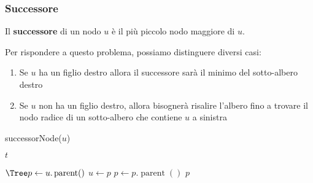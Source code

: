         \subsubsection{Successore}
            \begin{definition}
                Il \textbf{successore} di un nodo $ u $ è il più piccolo nodo maggiore di $ u $.
            \end{definition}
            Per rispondere a questo problema, possiamo distinguere diversi casi:
            \begin{enumerate}
                \item Se $ u $ ha un figlio destro allora il successore sarà il minimo del sotto-albero destro
                \item Se $ u $ non ha un figlio destro, allora bisognerà risalire l'albero fino a trovare il nodo radice di un sotto-albero che contiene $ u$ a sinistra
            \end{enumerate}
            \begin{algorithm}[H]
                \caption{\Tree successorNode(\Tree $ u $)}
                \begin{algorithmic}
                        \State \Return $t$ 
                    \EndIf
                     
                        \State \Return {}
                \end{algorithmic}
            \end{algorithm}
            \begin{algorithm}[H]
                \begin{algorithmic}
                    \Else {}
                        \State $\Tree p \gets u.\operatorname{parent}()$
                            \State $ u \gets p $
                            \State $ p \gets p.\operatorname{parent}() $
                        \EndWhile
                        \State \Return $ p $
                    \EndIf
                \end{algorithmic}
            \end{algorithm}
